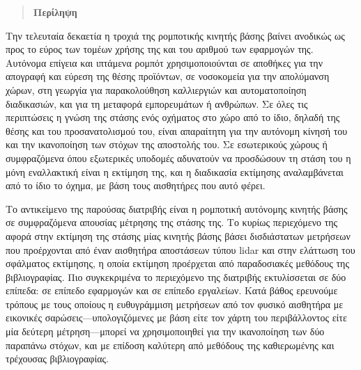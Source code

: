 \singlespace

\vfill
\begin{quotation}
\begin{center}
\textbf{Περίληψη}
\end{center}
\noindent
\end{quotation}

Την τελευταία δεκαετία η τροχιά της ρομποτικής κινητής βάσης βαίνει ανοδικώς ως
προς το εύρος των τομέων χρήσης της και του αριθμού των εφαρμογών της. Αυτόνομα
επίγεια και ιπτάμενα ρομπότ χρησιμοποιούνται σε αποθήκες για την απογραφή και
εύρεση της θέσης προϊόντων, σε νοσοκομεία για την απολύμανση χώρων, στη γεωργία
για παρακολούθηση καλλιεργιών και αυτοματοποίηση διαδικασιών, και για τη
μεταφορά εμπορευμάτων ή ανθρώπων. Σε όλες τις περιπτώσεις η γνώση της στάσης
ενός οχήματος στο χώρο από το ίδιο, δηλαδή της θέσης και του προσανατολισμού
του, είναι απαραίτητη για την αυτόνομη κίνησή του και την ικανοποίηση των
στόχων της αποστολής του. Σε εσωτερικούς χώρους ή συμφραζόμενα όπου εξωτερικές
υποδομές αδυνατούν να προσδώσουν τη στάση του η μόνη εναλλακτική είναι η
εκτίμηση της, και η διαδικασία εκτίμησης αναλαμβάνεται από το ίδιο το όχημα, με
βάση τους αισθητήρες που αυτό φέρει.

Το αντικείμενο της παρούσας διατριβής είναι η ρομποτική αυτόνομης κινητής βάσης
σε συμφραζόμενα απουσίας μέτρησης της στάσης της. Το κυρίως περιεχόμενο της
αφορά στην εκτίμηση της στάσης μίας κινητής βάσης βάσει δισδιάστατων μετρήσεων
που προέρχονται από έναν αισθητήρα αποστάσεων τύπου lidar και στην ελάττωση του
σφάλματος εκτίμησης, η οποία εκτίμηση προέρχεται από παραδοσιακές μεθόδους της
βιβλιογραφίας. Πιο συγκεκριμένα το περιεχόμενο της διατριβής εκτυλίσσεται σε
δύο επίπεδα: σε επίπεδο εφαρμογών και σε επίπεδο εργαλείων.  Κατά βάθος
ερευνούμε τρόπους με τους οποίους η ευθυγράμμιση μετρήσεων από τον φυσικό
αισθητήρα με εικονικές σαρώσεις---υπολογιζόμενες με βάση είτε τον χάρτη του
περιβάλλοντος είτε μία δεύτερη μέτρηση---μπορεί να χρησιμοποιηθεί για την
ικανοποίηση των δύο παραπάνω στόχων, και με επίδοση καλύτερη από μεθόδους της
καθιερωμένης και τρέχουσας βιβλιογραφίας.

